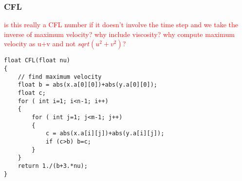 \documentclass[notitlepage]{article}
\begin{document}
\subsubsection{CFL}

\textcolor{red}{is this really a CFL number if it doesn't involve the time step and
we take the inverse of maximum velocity? why include viscosity? why compute maximum
velocity as u+v and not $sqrt(u^2+v^2)$?}

\begin{lstlisting}[style=myCpp]
float CFL(float nu)
{
	// find maximum velocity
	float b = abs(x.a[0][0])+abs(y.a[0][0]);
	float c;
	for ( int i=1; i<n-1; i++)
	{
		for ( int j=1; j<m-1; j++)
		{ 
			c = abs(x.a[i][j])+abs(y.a[i][j]);
			if (c>b) b=c;
		}
	}
	return 1./(b+3.*nu);
}
\end{lstlisting}

\begin{comment}
\section{a}

\subsection{Description}

a

\subsection{Internal fields}

\begin{itemize}
\item \texttt{<float> b} - a
\end{itemize}

\subsection{Methods}

\subsubsection{a}

a
\end{comment}
\end{document}
